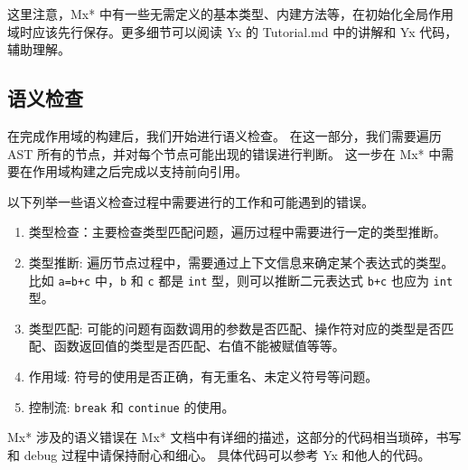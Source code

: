 这里注意，Mx* 中有一些无需定义的基本类型、内建方法等，在初始化全局作用域时应该先行保存。更多细节可以阅读 Yx 的 Tutorial.md 中的讲解和 Yx 代码，辅助理解。

\subsection{语义检查}
在完成作用域的构建后，我们开始进行语义检查。
在这一部分，我们需要遍历 AST 所有的节点，并对每个节点可能出现的错误进行判断。
这一步在 Mx* 中需要在作用域构建之后完成以支持前向引用。

以下列举一些语义检查过程中需要进行的工作和可能遇到的错误。

\begin{enumerate}
    \item 类型检查：主要检查类型匹配问题，遍历过程中需要进行一定的类型推断。
    \item 类型推断: 遍历节点过程中，需要通过上下文信息来确定某个表达式的类型。比如 \texttt{a=b+c}
      中，\texttt{b} 和 \texttt{c} 都是 \texttt{int} 型，则可以推断二元表达式 \texttt{b+c} 也应为 \texttt{int} 型。
    \item 类型匹配: 可能的问题有函数调用的参数是否匹配、操作符对应的类型是否匹配、函数返回值的类型是否匹配、右值不能被赋值等等。
    \item 作用域: 符号的使用是否正确，有无重名、未定义符号等问题。
    \item 控制流: \texttt{break} 和 \texttt{continue} 的使用。
\end{enumerate}


Mx* 涉及的语义错误在 Mx* 文档中有详细的描述，这部分的代码相当琐碎，书写和 debug 过程中请保持耐心和细心。
具体代码可以参考 Yx 和他人的代码。

